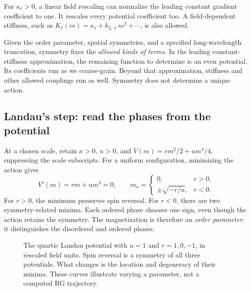 \documentclass[11pt]{article}
\begin{document}
For \(\kappa_\ell>0\), a linear field rescaling can normalize the leading
constant gradient coefficient to one. It rescales every potential
coefficient too. A field-dependent stiffness, such as
\(K_\ell(m)=\kappa_\ell+k_{2,\ell}m^2+\cdots\), is also allowed.

\begin{keyidea}
Given the order parameter, spatial symmetries, and a specified
long-wavelength truncation, symmetry fixes the \emph{allowed kinds of
terms}. In the leading constant-stiffness approximation, the remaining
function to determine is an even potential. Its coefficients run as we
coarse-grain. Beyond that approximation, stiffness and other allowed
couplings run as well. Symmetry does not determine a unique action.
\end{keyidea}

\subsection{Landau's step: read the phases from the potential}

At a chosen scale, retain \(\kappa>0\), \(u>0\), and
\(V(m)=rm^2/2+um^4/4\), suppressing the scale subscripts. For a uniform
configuration, minimizing the action gives
\begin{equation}
V'(m)=rm+um^3=0,\qquad
m_\star=\begin{cases}
0,&r>0,\\
\pm\sqrt{-r/u},&r<0.
\end{cases}
\label{eq:LandauMinima}
\end{equation}
For \(r>0\), the minimum preserves spin reversal. For \(r<0\), there are
two symmetry-related minima. Each ordered phase chooses one sign, even
though the action retains the symmetry. The magnetization is therefore an
\emph{order parameter}: it distinguishes the disordered and ordered phases.

\begin{figure}[htbp]
\centering
{}
\caption{The quartic Landau potential with \(u=1\) and
\(r=1,0,-1\), in rescaled field units. Spin reversal is a symmetry of all
three potentials. What changes is the location and degeneracy of their
minima. These curves illustrate varying a parameter, not a computed RG
trajectory.}
\label{fig:Landau}
\end{figure}
\end{document}
